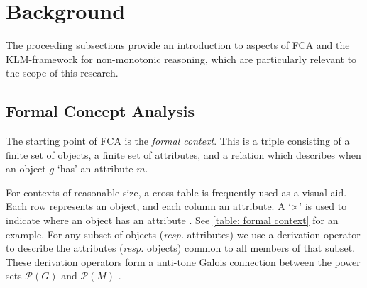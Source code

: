\section{Background}
\label{section: background}

The proceeding subsections provide an introduction to aspects of FCA and the KLM-framework for non-monotonic reasoning, which are particularly relevant to the scope of this research.

\subsection{Formal Concept Analysis}
\label{subsection: formal concept analysis}

The starting point of FCA is the \textit{formal context}. This is a triple consisting of a finite set of objects, a finite set of attributes, and a relation which describes when an object $g$ `has' an attribute $m$.
%
%
For contexts of reasonable size, a cross-table is frequently used as a visual aid. Each row represents an object, and each column an attribute. A `$\times$' is used to indicate where an object has an attribute \cite{ganter1999formal,ganter2016conceptual}. See \autoref{table: formal context} for an example.
For any subset of objects (\textit{resp.} attributes) we use a derivation operator to describe the attributes (\textit{resp.} objects) common to all members of that subset. These derivation operators form a anti-tone Galois connection between the power sets $\mathcal{P}(G)$ and $\mathcal{P}(M)$ \cite{ganter1999formal}.
%
